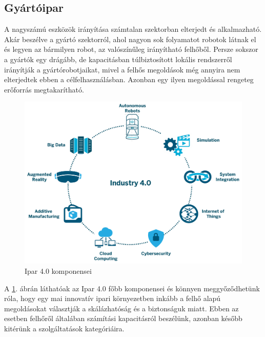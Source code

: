 \subsection{Gyártóipar}
A nagyszámú eszközök irányítása számtalan szektorban elterjedt és alkalmazható. Akár beszélve a gyártó szektorról, ahol nagyon sok folyamatot robotok látnak el és legyen az bármilyen robot, az valószínűleg irányítható felhőből. Persze sokszor a gyártók egy drágább, de kapacitásban túlbiztosított lokális rendszerről irányítják a gyártórobotjaikat, mivel a felhős megoldások még annyira nem elterjedtek ebben a célfelhasználásban. Azonban egy ilyen megoldással rengeteg erőforrás megtakarítható.
\begin{figure}
	\centering
	\includegraphics[width=\linewidth]{figures/industry40.png}
	\caption{Ipar 4.0 komponensei \cite{industry40}}
	\label{fig:industry40}
\end{figure}
A \ref{fig:industry40}. ábrán láthatóak az Ipar 4.0 főbb komponensei és könnyen meggyőződhetünk róla, hogy egy mai innovatív ipari környezetben inkább a felhő alapú megoldásokat választják a skálázhatóság és a biztonságuk miatt. Ebben az esetben felhőről általában számítási kapacitásról beszélünk, azonban később kitérünk a szolgáltatások kategóriáira.
